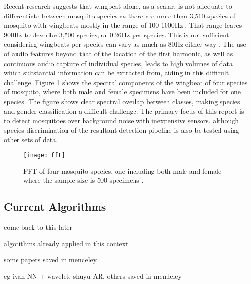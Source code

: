         Recent research suggests that wingbeat alone, as a scalar, is not adequate to differentiate between mosquito species as there are more than 3,500 species of mosquito with wingbeats mostly in the range of 100-1000Hz \cite{Chen2014}. That range leaves 900Hz to describe 3,500 species, or 0.26Hz per species. This is not sufficient considering wingbeats per species can vary as much as 80Hz either way \cite{Arthur2014}. The use of audio features beyond that of the location of the first harmonic, as well as continuous audio capture of individual species, leads to high volumes of data which substantial information can be extracted from, aiding in this difficult challenge. Figure \ref{fig:bg-litreview-mozz-fft} shows the spectral components of the wingbeat of four species of mosquito, where both male and female specimens have been included for one species. The figure shows clear spectral overlap between classes, making species and gender classification a difficult challenge. The primary focus of this report is to detect mosquitoes over background noise with inexpensive sensors, although species discrimination of the resultant detection pipeline is also be tested using other sets of data.
        \begin{figure}
            \centering
            \texttt{[image: fft]}
            \caption{FFT of four mosquito species, one including both male and female where the sample size is 500 specimens \cite{Chen2014}.}
            \label{fig:bg-litreview-mozz-fft}
        \end{figure}


    
    \subsection{Current Algorithms}
    \label{subsec:bg-litreview-currentalgs}
        \begin{sitemize}
            \item{come back to this later}
            \item{algorithms already applied in this context}
            \item{some papers saved in mendeley}
            \item{eg ivan NN + wavelet, shuyu AR, others saved in mendeley}
        \end{sitemize}
    

